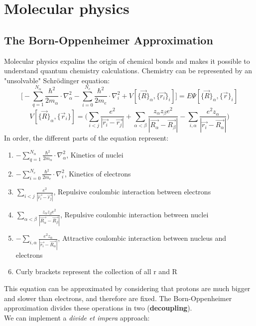 \graphicspath{{chapters/07/}}
\chapter{Molecular physics}
\section{The Born-Oppenheimer Approximation}
Molecular physics expalins the origin of chemical bonds and makes it possible to understand quantum chemistry calculations. Chemistry can be represented by an "unsolvable" Schr\"odinger equation:\\
\[
\bigg[-\sum_{q=1}^{N_{\alpha}}\frac{\hbar^2}{2m_{\alpha}}\cdot\nabla_{\alpha}^2
-\sum_{i=0}^{N_e}\frac{\hbar^2}{2m_e}\cdot\nabla^2_i
+V[\{\vec{R}\}_{\alpha},\{\vec{r_i}\}_i]\bigg]=E\Psi[\{\vec{R}\}_{\alpha},\{\vec{r}\}_i]
\]
\[
V[\{\vec{R}\}_{\alpha},\{\vec{r}_i\}]=\bigg(\sum_{i<j}\frac{e^2}{|\vec{r_i}-\vec{r_j}|}
+\sum_{\alpha<\beta}\frac{z_{\alpha}z_{\beta}e^2}{|\vec{R_{\alpha}}-\vec{R_{\beta}}|}
-\sum_{i,\alpha}\frac{e^2z_{\alpha}}{|\vec{r_i}-\vec{R_{\alpha}}|}\bigg)\]
In order, the different parts of the equation represent:
\begin{enumerate}
	\item $-\sum_{q=1}^{N_{\alpha}}\frac{\hbar^2}{2m_{\alpha}}\cdot\nabla_{\alpha}^2$,  Kinetics of nuclei
	\item $-\sum_{i=0}^{N_e}\frac{\hbar^2}{2m_e}\cdot\nabla^2_i$,  Kinetics of electrons
	\item $\sum_{i<j}\frac{e^2}{|\vec{r_i}-\vec{r_j}|}$,  Repulsive coulombic interaction between electrons
	\item $\sum_{\alpha<\beta}\frac{z_{\alpha}z_{\beta}e^2}{|\vec{R_{\alpha}}-\vec{R_{\beta}}|}$,  Repulsive coulombic interaction between nuclei
	\item $-\sum_{i,\alpha}\frac{e^2z_{\alpha}}{|\vec{r_i}-\vec{R_{\alpha}}|}$,  Attractive coulombic interaction between nucleus and electrons
	\item Curly brackets represent the collection of all r and R
\end{enumerate}
This equation can be approximated by considering that protons are much bigger and slower than electrons, and therefore are fixed. The Born-Oppenheimer approximation divides these operations in two (\textbf{decoupling}).\\
\newline
We can implement a \textit{divide et impera} approach:\\
